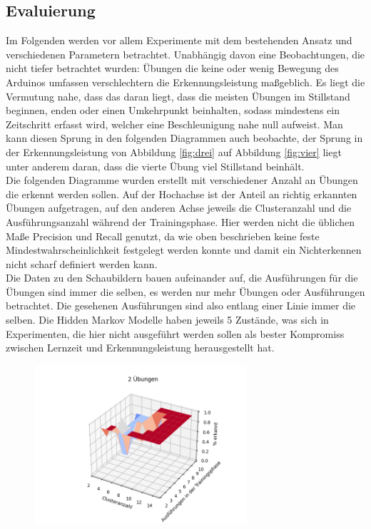 \documentclass{article}
\begin{document}
\begin{align-*}
\section{Evaluierung}
\label{sec:evaluation}
Im Folgenden werden vor allem Experimente mit dem bestehenden Ansatz und verschiedenen Parametern betrachtet.
Unabhängig davon eine Beobachtungen, die nicht tiefer betrachtet wurden:
Übungen die keine oder wenig Bewegung des Arduinos umfassen verschlechtern die Erkennungsleistung maßgeblich.
Es liegt die Vermutung nahe, dass das daran liegt, dass die meisten Übungen im Stillstand beginnen, enden oder einen \glqq Umkehrpunkt \grqq{} beinhalten, sodass mindestens ein Zeitschritt erfasst wird, welcher eine Beschleunigung nahe null aufweist.
Man kann diesen Sprung in den folgenden Diagrammen auch beobachte, der Sprung in der Erkennungsleistung von Abbildung \ref{fig:drei} auf Abbildung \ref{fig:vier} liegt unter anderem daran, dass die vierte Übung viel Stillstand beinhält.\\
Die folgenden Diagramme wurden erstellt mit verschiedener Anzahl an Übungen die erkennt werden sollen.
Auf der Hochachse ist der Anteil an richtig erkannten Übungen aufgetragen, auf den anderen Achse jeweils die Clusteranzahl und die Ausführungsanzahl während der Trainingsphase.
Hier werden nicht die üblichen Maße Precision und Recall genutzt, da wie oben beschrieben keine feste Mindestwahrscheinlichkeit festgelegt werden konnte und damit ein Nichterkennen nicht scharf definiert werden kann.\\
Die Daten zu den Schaubildern bauen aufeinander auf, die Ausführungen für die Übungen sind immer die selben, es werden nur mehr Übungen oder Ausführungen betrachtet.
Die gesehenen Ausführungen sind also entlang einer Linie immer die selben.
Die Hidden Markov Modelle haben jeweils 5 Zustände, was sich in Experimenten, die hier nicht ausgeführt werden sollen als bester Kompromiss zwischen Lernzeit und Erkennungsleistung herausgestellt hat.
\medskip
\begin{figure}[h]
\centering
\includegraphics[width=0.7\textwidth]{figures/2_graph.png}

\end{figure}
\end{align-*}
\end{document}
